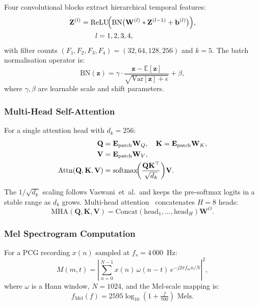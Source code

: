\documentclass[AMA,STIX1COL,]{WileyNJD-v2}
\begin{document}
Four convolutional blocks extract hierarchical temporal features:
\begin{equation}
\begin{split}
\mathbf{Z}^{(l)} &= \mathrm{ReLU}\!\Bigl(
  \mathrm{BN}\bigl(\mathbf{W}^{(l)} * \mathbf{Z}^{(l-1)}
  + \mathbf{b}^{(l)}\bigr)\Bigr),\\
&\qquad l=1,2,3,4,
\end{split}
\label{eq:cnn}
\end{equation}
with filter counts $(F_1,F_2,F_3,F_4) = (32,64,128,256)$ and $k=5$.
The batch normalisation operator is:
\begin{equation}
\mathrm{BN}(\mathbf{z}) =
  \gamma \cdot \frac{\mathbf{z} - \mathbb{E}[\mathbf{z}]}
               {\sqrt{\mathrm{Var}[\mathbf{z}]+\epsilon}} + \beta,
\label{eq:bn}
\end{equation}
where $\gamma,\beta$ are learnable scale and shift parameters.

\subsubsection{Multi-Head Self-Attention}

For a single attention head with $d_k = 256$:
\begin{align}
\mathbf{Q} &= \mathbf{E}_{\text{patch}}\mathbf{W}_Q,\quad
\mathbf{K} = \mathbf{E}_{\text{patch}}\mathbf{W}_K,\notag\\
\mathbf{V} &= \mathbf{E}_{\text{patch}}\mathbf{W}_V, \label{eq:qkv}\\
\mathrm{Attn}(\mathbf{Q},\mathbf{K},\mathbf{V}) &=
  \mathrm{softmax}\!\!\left(
    \frac{\mathbf{Q}\mathbf{K}^\top}{\sqrt{d_k}}
  \right)\!\mathbf{V}.\label{eq:attn}
\end{align}

The $1/\sqrt{d_k}$ scaling follows Vaswani~et~al.\ and keeps the
pre-softmax logits in a stable range as $d_k$ grows.
Multi-head attention~\cite{vaswani2017} concatenates $H=8$ heads:
\begin{equation}
\mathrm{MHA}(\mathbf{Q},\mathbf{K},\mathbf{V})
  = \mathrm{Concat}(\mathrm{head}_1,\ldots,\mathrm{head}_H)\mathbf{W}^O.
\label{eq:mha}
\end{equation}

\subsubsection{Mel Spectrogram Computation}

For a PCG recording $x(n)$ sampled at $f_s=4\,000$~Hz:
\begin{equation}
M(m,t)=\left|
  \sum_{n=0}^{N-1} x(n)\,\omega(n-t)\,e^{-j2\pi f_m n/N}
\right|^2,
\label{eq:mel}
\end{equation}
where $\omega$ is a Hann window, $N=1024$, and the Mel-scale mapping is:
\begin{equation}
f_{\mathrm{Mel}}(f)=2595\log_{10}\!\left(1+\tfrac{f}{700}\right)
\text{ Mels.}
\label{eq:melscale}
\end{equation}
\end{document}
